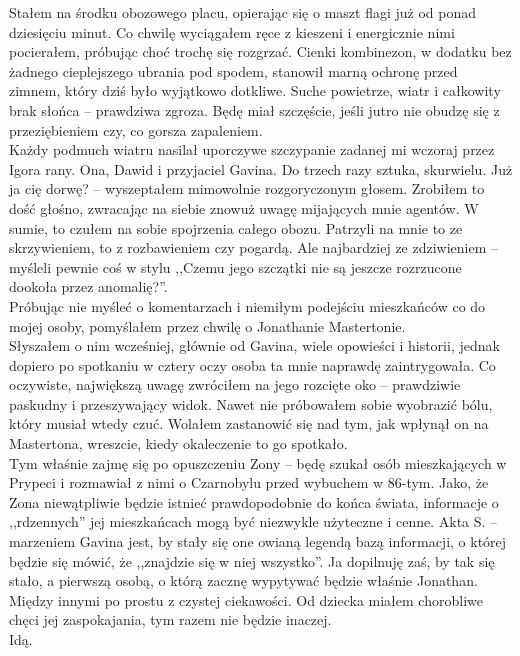 \documentclass[../MAIN.tex]{subfiles}
\begin{document}
Stałem na środku obozowego placu, opierając się o maszt flagi już od ponad dziesięciu minut. Co chwilę wyciągałem ręce z kieszeni i energicznie nimi pocierałem, próbując choć trochę się rozgrzać. Cienki kombinezon, w dodatku bez żadnego cieplejszego ubrania pod spodem, stanowił marną ochronę przed zimnem, który dziś było wyjątkowo dotkliwe. Suche powietrze, wiatr i całkowity brak słońca -- prawdziwa zgroza. Będę miał szczęście, jeśli jutro nie obudzę się z przeziębieniem czy, co gorsza zapaleniem.\\
Każdy podmuch wiatru nasilał uporczywe szczypanie zadanej mi wczoraj przez Igora rany. Ona, Dawid i przyjaciel Gavina. Do trzech razy sztuka, skurwielu.
\sx Już ja cię dorwę? -- wyszeptałem mimowolnie rozgoryczonym głosem.
\qd
Zrobiłem to dość głośno, zwracając na siebie znowuż uwagę mijających mnie agentów. W sumie, to czułem na sobie spojrzenia całego obozu. Patrzyli na mnie to ze skrzywieniem, to z rozbawieniem czy pogardą. Ale najbardziej ze zdziwieniem -- myśleli pewnie coś w stylu ,,Czemu jego szczątki nie są jeszcze rozrzucone dookoła przez anomalię?''.\\
Próbując nie myśleć o komentarzach i niemiłym podejściu mieszkańców co do mojej osoby, pomyślałem przez chwilę o Jonathanie Mastertonie.\\
Słyszałem o nim wcześniej, głównie od Gavina, wiele opowieści i historii, jednak dopiero po spotkaniu w cztery oczy osoba ta mnie naprawdę zaintrygowała. Co oczywiste, największą uwagę zwróciłem na jego rozcięte oko -- prawdziwie paskudny i przeszywający widok. Nawet nie próbowałem sobie wyobrazić bólu, który musiał wtedy czuć. Wolałem zastanowić się nad tym, jak wpłynął on na Mastertona, wreszcie, kiedy okaleczenie to go spotkało.\\
Tym właśnie zajmę się po opuszczeniu Zony -- będę szukał osób mieszkających w Prypeci i rozmawiał z nimi o Czarnobylu przed wybuchem w 86-tym. Jako, że Zona niewątpliwie będzie istnieć prawdopodobnie do końca świata, informacje o ,,rdzennych'' jej mieszkańcach mogą być niezwykle użyteczne i cenne. Akta S. -- marzeniem Gavina jest, by stały się one owianą legendą bazą informacji, o której będzie się mówić, że ,,znajdzie się w niej wszystko''. Ja dopilnuję zaś, by tak się stało, a pierwszą osobą, o którą zacznę wypytywać będzie właśnie Jonathan.\\
Między innymi po prostu z czystej ciekawości. Od dziecka miałem chorobliwe chęci jej zaspokajania, tym razem nie będzie inaczej.\\
Idą.\\
\end{document}
